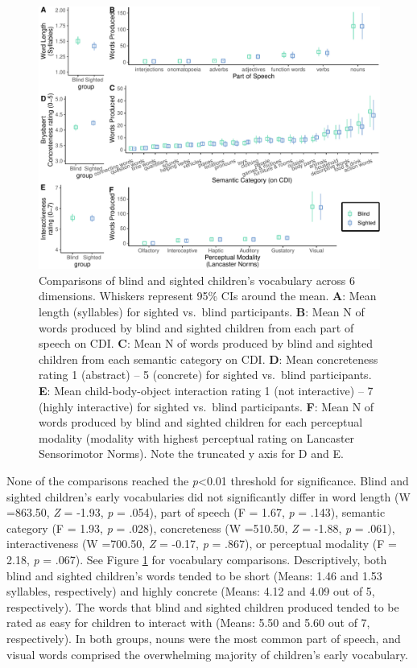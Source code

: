 \documentclass[
  man,floatsintext]{apa6}
\begin{document}
\begin{figure}
\centering
\includegraphics{VI_CDI_manuscript_files/figure-latex/vocab-comparison-1.pdf}
\caption{\label{fig:vocab-comparison}Comparisons of blind and sighted children's vocabulary across 6 dimensions. Whiskers represent 95\% CIs around the mean. \textbf{A}: Mean length (syllables) for sighted vs.~blind participants. \textbf{B}: Mean N of words produced by blind and sighted children from each part of speech on CDI. \textbf{C}: Mean N of words produced by blind and sighted children from each semantic category on CDI. \textbf{D}: Mean concreteness rating 1 (abstract) -- 5 (concrete) for sighted vs.~blind participants. \textbf{E}: Mean child-body-object interaction rating 1 (not interactive) -- 7 (highly interactive) for sighted vs.~blind participants. \textbf{F}: Mean N of words produced by blind and sighted children for each perceptual modality (modality with highest perceptual rating on Lancaster Sensorimotor Norms). Note the truncated y axis for D and E.}
\end{figure}

None of the comparisons reached the \emph{p}\textless0.01 threshold for significance. Blind and sighted children's early vocabularies did not significantly differ in word length (W =863.50, \emph{Z} = -1.93, \emph{p} = .054), part of speech (F = 1.67, \emph{p} = .143), semantic category (F = 1.93, \emph{p} = .028), concreteness (W =510.50, \emph{Z} = -1.88, \emph{p} = .061), interactiveness (W =700.50, \emph{Z} = -0.17, \emph{p} = .867), or perceptual modality (F = 2.18, \emph{p} = .067). See Figure \ref{fig:vocab-comparison} for vocabulary comparisons. Descriptively, both blind and sighted children's words tended to be short (Means: 1.46 and 1.53 syllables, respectively) and highly concrete (Means: 4.12 and 4.09 out of 5, respectively). The words that blind and sighted children produced tended to be rated as easy for children to interact with (Means: 5.50 and 5.60 out of 7, respectively). In both groups, nouns were the most common part of speech, and visual words comprised the overwhelming majority of children's early vocabulary.
\end{document}
